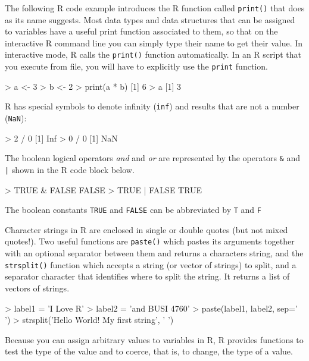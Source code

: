 The following R code example introduces the R function called \texttt{print()} that does as its name suggests. Most data types and data structures that can be assigned to variables have a useful print function associated to them, so that on the interactive R command line you can simply type their name to get their value. In interactive mode, R calls the \texttt{print()} function automatically. In an R script that you execute from file, you will have to explicitly use the \texttt{print} function.

\begin{Rcode}
> a <- 3
> b <- 2
> print(a * b)
[1] 6
> a
[1] 3
\end{Rcode}

R has special symbols to denote infinity (\texttt{inf}) and results that are not a number (\texttt{NaN}):

\begin{Rcode}
> 2 / 0
[1] Inf
> 0 / 0
[1] NaN
\end{Rcode}

\noindent The boolean logical operators \emph{and} and \emph{or} are represented by the operators \texttt{\&} and \texttt{|} shown in the R code block below.

\begin{Rcode}
> TRUE & FALSE
FALSE
> TRUE | FALSE
TRUE
\end{Rcode}

\begin{infobox}
The boolean constants \texttt{TRUE} and \texttt{FALSE} can be abbreviated by \texttt{T} and \texttt{F}
\end{infobox}

Character strings in R are enclosed in single or double quotes (but not mixed quotes!). Two useful functions are \texttt{paste()} which pastes its arguments together with an optional separator between them and returns a characters string, and the \texttt{strsplit()} function which accepts a string (or vector of strings) to split, and a separator character that identifies where to split the string. It returns a list of vectors of strings.

\begin{Rcode}
> label1 = 'I Love R'
> label2 = 'and BUSI 4760'
> paste(label1, label2, sep=' ')
> strsplit('Hello World! My first string', ' ')
\end{Rcode}

Because you can assign arbitrary values to variables in R, R provides functions to test the type of the value and to coerce, that is, to change, the type of a value.

